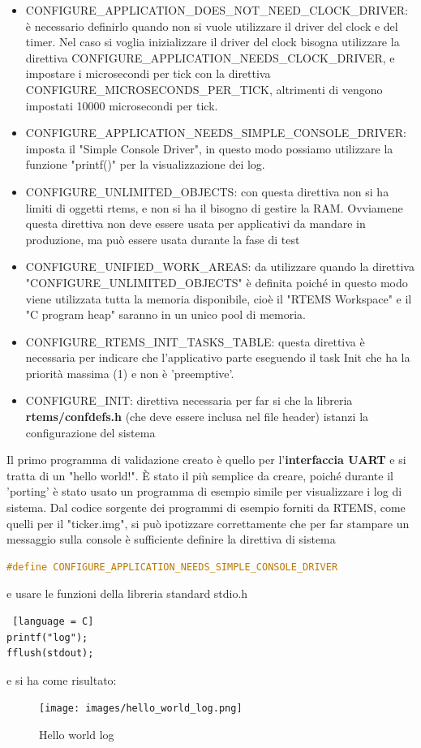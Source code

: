 \documentclass[12pt, a4paper, titlepage, oneside]{book}
\begin{document}
\begin{itemize}
    \item \parbox[t]{\linewidth}{CONFIGURE\_APPLICATION\_DOES\_NOT\_NEED\_CLOCK\_DRIVER: è necessario definirlo quando non si vuole utilizzare il driver del clock e del timer. Nel caso si voglia inizializzare il driver del clock bisogna utilizzare la direttiva CONFIGURE\_APPLICATION\_NEEDS\_CLOCK\_DRIVER, e impostare i microsecondi per tick con la direttiva CONFIGURE\_MICROSECONDS\_PER\_TICK, altrimenti di vengono impostati 10000 microsecondi per tick.}
    \item \parbox[t]{\linewidth}{CONFIGURE\_APPLICATION\_NEEDS\_SIMPLE\_CONSOLE\_DRIVER: imposta il "Simple Console Driver", in questo modo possiamo utilizzare la funzione "printf()" per la visualizzazione dei log.}
    \item \parbox[t]{\linewidth}{CONFIGURE\_UNLIMITED\_OBJECTS: con questa direttiva non si ha limiti di oggetti rtems, e non si ha il bisogno di gestire la RAM. Ovviamene questa direttiva non deve essere usata per applicativi da mandare in produzione, ma può essere usata durante la fase di test}
    \item \parbox[t]{\linewidth}{CONFIGURE\_UNIFIED\_WORK\_AREAS: da utilizzare quando la direttiva "CONFIGURE\_UNLIMITED\_OBJECTS" è definita poiché in questo modo viene utilizzata tutta la memoria disponibile, cioè  il  "RTEMS Workspace" e il "C program heap" saranno in un unico pool di memoria.}
    \item\parbox[t]{\linewidth}{ CONFIGURE\_RTEMS\_INIT\_TASKS\_TABLE: questa direttiva è necessaria per indicare che l'applicativo parte eseguendo il task Init che ha la priorità massima (1) e non è 'preemptive'.}
    \item\parbox[t]{\linewidth}{ CONFIGURE\_INIT: direttiva necessaria per far si che la libreria \textbf{rtems/confdefs.h} (che deve essere inclusa nel file header) istanzi la configurazione del sistema}
\end{itemize}
Il primo programma di validazione creato è quello per l'\textbf{interfaccia UART} e si tratta di un "hello world!". È stato il più semplice da creare, poiché durante il 'porting' è stato usato un programma di esempio simile per visualizzare i log di sistema. Dal codice sorgente dei programmi di esempio forniti da RTEMS, come quelli per il "ticker.img",  si può ipotizzare correttamente che per far stampare un messaggio sulla console è sufficiente definire la direttiva di sistema 
\begin{lstlisting}[language = C]
#define CONFIGURE_APPLICATION_NEEDS_SIMPLE_CONSOLE_DRIVER 
\end{lstlisting} 
e usare le funzioni della libreria standard stdio.h \begin{lstlisting} [language = C]
printf("log"); 
fflush(stdout);
\end{lstlisting}
e si ha come risultato:
\begin{figure}[h]
    \centering
    \texttt{[image: images/hello\_world\_log.png]}
    \caption{Hello world log}
    \label{fig:hello_world_log}
\end{figure}
\end{document}
